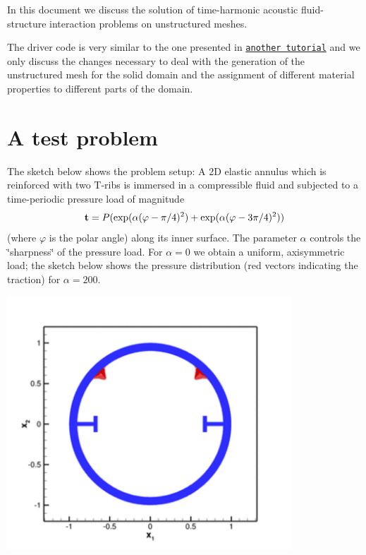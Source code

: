 In this document we discuss the solution of time-\/harmonic acoustic fluid-\/structure interaction problems on unstructured meshes.

The driver code is very similar to the one presented in \href{../../acoustic_fsi_annulus/html/index.html}{\tt another tutorial} and we only discuss the changes necessary to deal with the generation of the unstructured mesh for the solid domain and the assignment of different material properties to different parts of the domain.



 

\hypertarget{index_test}{}\section{A test problem}\label{index_test}
The sketch below shows the problem setup\+: A 2D elastic annulus which is reinforced with two T-\/ribs is immersed in a compressible fluid and subjected to a time-\/periodic pressure load of magnitude \[ {\bf t} = P ( \exp(\alpha(\varphi-\pi/4)^2) + \exp(\alpha(\varphi-3\pi/4)^2) ) \] (where $ \varphi $ is the polar angle) along its inner surface. The parameter $ \alpha $ controls the \char`\"{}sharpness\char`\"{} of the pressure load. For $ \alpha=0 $ we obtain a uniform, axisymmetric load; the sketch below shows the pressure distribution (red vectors indicating the traction) for $ \alpha = 200. $

 
\begin{DoxyImage}
\includegraphics[width=0.8\textwidth]{setup}
\end{DoxyImage}


